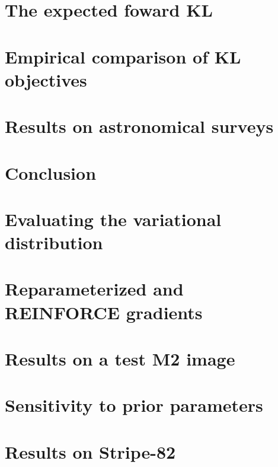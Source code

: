 \documentclass[twoside,11pt]{article}
\begin{document}
\section{The expected foward KL}
\label{sec:wake_sleep}




\section{Empirical comparison of KL objectives}


\section{Results on astronomical surveys}




\section{Conclusion}
\label{sec:discussion}




\acks{}


\newpage

\appendix
\renewcommand\thefigure{A.\arabic{figure}}
\renewcommand\thetable{A.\arabic{table}}
\setcounter{figure}{0}
\setcounter{table}{0}


\section{Evaluating the variational distribution}
\label{sec:eval_var_distr}


\section{Reparameterized and REINFORCE gradients}
\label{sec:reparam_details}


\section{Results on a test M2 image}
\label{sec:test_m2}



\section{Sensitivity to prior parameters}
\label{sec:prior_sensitivity}



\section{Results on Stripe-82}
\label{sec:results_sparse_field}


\clearpage

\vskip 0.2in

\end{document}
